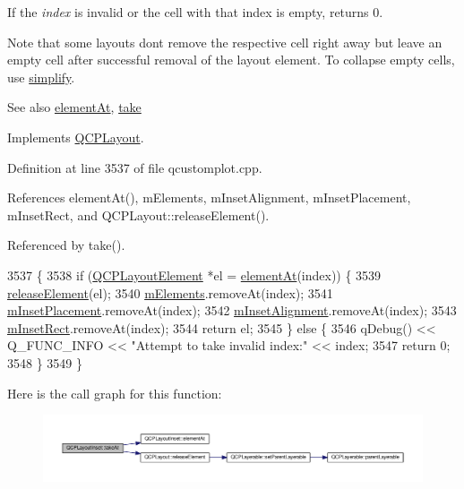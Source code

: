 If the {\itshape index} is invalid or the cell with that index is empty, returns 0.

Note that some layouts don\textquotesingle{}t remove the respective cell right away but leave an empty cell after successful removal of the layout element. To collapse empty cells, use \hyperlink{class_q_c_p_layout_inset_abb9eb23bf2d7c587a8abe02d065eae0a}{simplify}.

\begin{DoxySeeAlso}{See also}
\hyperlink{class_q_c_p_layout_inset_ab096d07b08f9b5455647f3ba7ff60e27}{element\+At}, \hyperlink{class_q_c_p_layout_inset_a9ac707ccff650633b97f52dd5cddcf49}{take} 
\end{DoxySeeAlso}


Implements \hyperlink{class_q_c_p_layout_a5a79621fa0a6eabb8b520cfc04fb601a}{Q\+C\+P\+Layout}.



Definition at line 3537 of file qcustomplot.\+cpp.



References element\+At(), m\+Elements, m\+Inset\+Alignment, m\+Inset\+Placement, m\+Inset\+Rect, and Q\+C\+P\+Layout\+::release\+Element().



Referenced by take().


\begin{DoxyCode}
3537                                                   \{
3538   \textcolor{keywordflow}{if} (\hyperlink{class_q_c_p_layout_element}{QCPLayoutElement} *el = \hyperlink{class_q_c_p_layout_inset_ab096d07b08f9b5455647f3ba7ff60e27}{elementAt}(index)) \{
3539     \hyperlink{class_q_c_p_layout_a4afbb4bef0071f72f91afdac4433a18e}{releaseElement}(el);
3540     \hyperlink{class_q_c_p_layout_inset_a7e618ac870f69f2fe2eae2a04500e763}{mElements}.removeAt(index);
3541     \hyperlink{class_q_c_p_layout_inset_a57a0a4e445cc78eada29765ecf092abe}{mInsetPlacement}.removeAt(index);
3542     \hyperlink{class_q_c_p_layout_inset_a55e9b84c310136ff985a6544184ab64a}{mInsetAlignment}.removeAt(index);
3543     \hyperlink{class_q_c_p_layout_inset_aaa8f6b5029458f3d97a65239524a2b33}{mInsetRect}.removeAt(index);
3544     \textcolor{keywordflow}{return} el;
3545   \} \textcolor{keywordflow}{else} \{
3546     qDebug() << Q\_FUNC\_INFO << \textcolor{stringliteral}{"Attempt to take invalid index:"} << index;
3547     \textcolor{keywordflow}{return} 0;
3548   \}
3549 \}
\end{DoxyCode}


Here is the call graph for this function\+:\nopagebreak
\begin{figure}[H]
\begin{center}
\leavevmode
\includegraphics[width=350pt]{class_q_c_p_layout_inset_ad6756a3b507e20496aaf7f5ca16c47d1_cgraph}
\end{center}
\end{figure}




